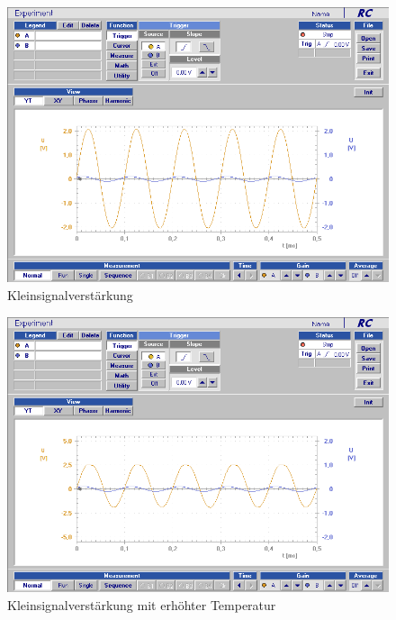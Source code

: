 \documentclass[12pt,a4paper]{article}
\begin{document}
\begin{figure}[H]
	\centering
	\includegraphics[scale=0.45]{./data/Braun_Kurz_PS8/Kleinsignalverstaerkung.png}
	\caption{Kleinsignalverstärkung}
	\label{fig:kleinsignalverstaerkung}
\end{figure}

\begin{figure}[H]
	\centering
	\includegraphics[scale=0.45]{./data/Braun_Kurz_PS8/Kleinsignalverstaerkung_Temp.png}
	\caption{Kleinsignalverstärkung mit erhöhter Temperatur}
	\label{fig:kleinsignalverstaerkung_temp}
\end{figure}
\end{document}
